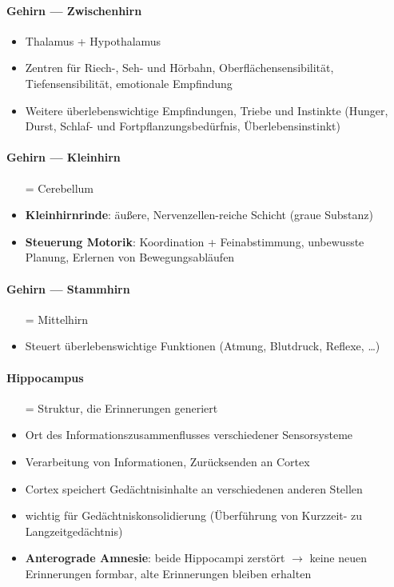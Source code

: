 \paragraph{Gehirn --- Zwischenhirn}
\begin{itemize}
  \item Thalamus + Hypothalamus
  \item Zentren für Riech-, Seh- und Hörbahn, Oberflächensensibilität, Tiefensensibilität, emotionale Empfindung
  \item Weitere überlebenswichtige Empfindungen, Triebe und Instinkte (Hunger, Durst, Schlaf- und Fortpflanzungsbedürfnis, Überlebensinstinkt)
\end{itemize}

\paragraph{Gehirn --- Kleinhirn}
\begin{itemize}
  \item[=] Cerebellum
  \item \textbf{Kleinhirnrinde}: äußere, Nervenzellen-reiche Schicht (graue Substanz) 
  \item \textbf{Steuerung Motorik}: Koordination + Feinabstimmung, unbewusste Planung, Erlernen von Bewegungsabläufen
\end{itemize}

\paragraph{Gehirn --- Stammhirn}
\begin{itemize}
  \item[=] Mittelhirn
  \item Steuert überlebenswichtige Funktionen (Atmung, Blutdruck, Reflexe, \dots)
\end{itemize}

\paragraph{Hippocampus}
\begin{itemize}
  \item[=] Struktur, die Erinnerungen generiert
  \item Ort des Informationszusammenflusses verschiedener Sensorsysteme
  \item Verarbeitung von Informationen, Zurücksenden an Cortex
  \item Cortex speichert Gedächtnisinhalte an verschiedenen anderen Stellen
  \item wichtig für Gedächtniskonsolidierung (Überführung von Kurzzeit- zu Langzeitgedächtnis)
  \item \textbf{Anterograde Amnesie}: beide Hippocampi zerstört \( \to \) keine neuen Erinnerungen formbar, alte Erinnerungen bleiben erhalten
\end{itemize}

